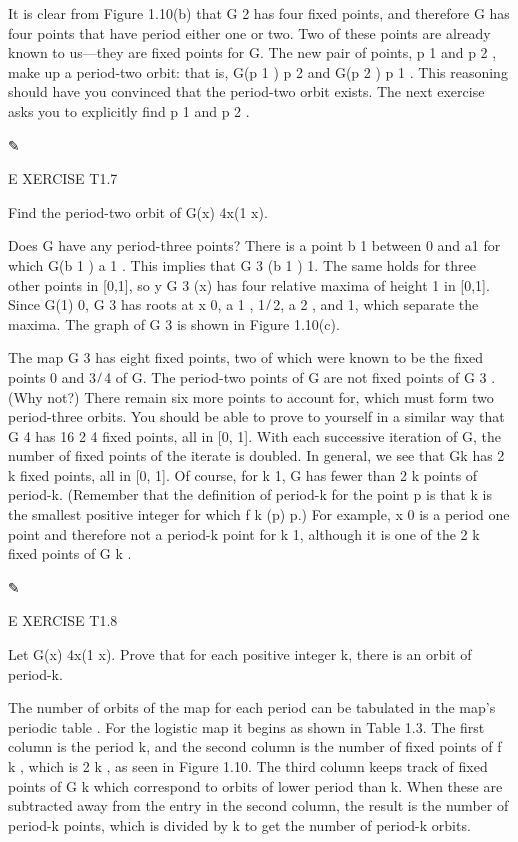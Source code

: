 It is clear from Figure 1.10(b) that G 2 has four ﬁxed points, and therefore G has four points that have 
period either one or two. Two of these points are already known to us—they are ﬁxed points for G. The new 
pair of points, p 1 and p 2 , make up a period-two orbit: that is, G(p 1 )  p 2 and G(p 2 )  p 1 . This 
reasoning should have you convinced that the period-two orbit exists. The next exercise asks you to 
explicitly ﬁnd p 1 and p 2 .

✎

E XERCISE T1.7

Find the period-two orbit of G(x)  4x(1  x).

Does G have any period-three points? There is a point b 1 between 0 and a1  for which G(b 1 )  a 1 . This 
implies that G 3 (b 1 )  1. The same holds for three other points in [0,1], so y  G 3 (x) has four relative 
maxima of height 1 in [0,1]. Since G(1)  0, G 3 has roots at x  0, a 1 , 1 ̸ 2, a 2 , and 1, which separate 
the maxima. The graph of G 3 is shown in Figure 1.10(c).

The map G 3 has eight ﬁxed points, two of which were known to be the ﬁxed points 0 and 3 ̸ 4 of G. The 
period-two points of G are not ﬁxed points of G 3 . (Why not?) There remain six more points to account 
for, which must form two period-three orbits. You should be able to prove to yourself in a similar way that 
G 4 has 16  2 4 ﬁxed points, all in [0, 1]. With each successive iteration of G, the number of ﬁxed 
points of the iterate is doubled. In general, we see that Gk  has 2 k ﬁxed points, all in [0, 1]. Of 
course, for k 
 1, G has fewer than 2 k points of period-k. (Remember that the deﬁnition of period-k for the point p is 
that k is the smallest positive integer for which f k (p)  p.) For example, x  0 is a period one point and 
therefore not a period-k point for k 
 1, although it is one of the 2 k ﬁxed points of G k .

✎

E XERCISE T1.8

Let G(x)  4x(1  x). Prove that for each positive integer k, there is an orbit of period-k.


The number of orbits of the map for each period can be tabulated in the map’s periodic table . For the 
logistic map it begins as shown in Table 1.3. The ﬁrst column is the period k, and the second column is 
the number of ﬁxed points of f k , which is 2 k , as seen in Figure 1.10. The third column keeps track of 
ﬁxed points of G k which correspond to orbits of lower period than k. When these are subtracted away from 
the entry in the second column, the result is the number of period-k points, which is divided by k to get 
the number of period-k orbits.

